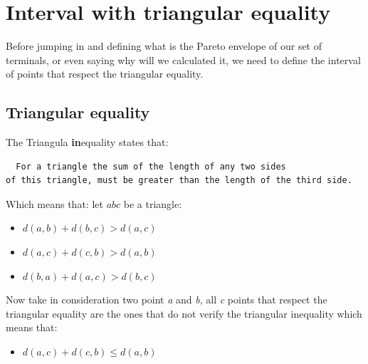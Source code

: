 \chapter{Interval with triangular equality}
Before jumping in and defining what is the Pareto envelope of our set of terminals, or even saying why will we calculated it, we need to define the interval of points that respect the triangular equality.

\section{Triangular equality} %
\noindent The Triangula \textbf{in}equality states that:
\begin{quoting} \begin{verbatim}
  For a triangle the sum of the length of any two sides
of this triangle, must be greater than the length of the third side.
\end{verbatim} \end{quoting}
Which means that: let $abc$ be a triangle:
\begin{itemize}[noitemsep, nolistsep]
	\item{$d(a,b)+d(b,c) > d(a,c)$}
	\item{$d(a,c)+d(c,b) > d(a,b)$}
	\item{$d(b,a)+d(a,c) > d(b,c)$}
	\newline
\end{itemize}

	Now take in consideration two point \emph{a} and \emph{b}, all \emph{c} points that respect the triangular equality are the ones that do not verify the triangular inequality which means that:
\begin{itemize}[noitemsep, nolistsep]
	\item{$d(a,c)+d(c,b) \leq d(a,b)$}
	\newline
\end{itemize}


